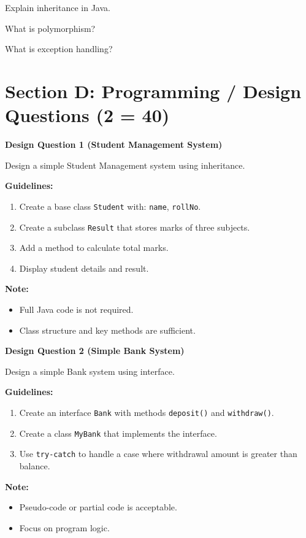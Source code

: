 \documentclass{USTBExam}
\begin{document}
\begin{problem}
Explain inheritance in Java.
\end{problem}

\begin{problem}
What is polymorphism?
\end{problem}

\begin{problem}
What is exception handling?
\end{problem}


\section{Section D: Programming / Design Questions (2  = 40)}

\begin{problem}
\textbf{Design Question 1 (Student Management System)}

Design a simple Student Management system using inheritance.

\textbf{Guidelines:}
\begin{enumerate}
  \item Create a base class \texttt{Student} with: \texttt{name}, \texttt{rollNo}.
  \item Create a subclass \texttt{Result} that stores marks of three subjects.
  \item Add a method to calculate total marks.
  \item Display student details and result.
\end{enumerate}

\textbf{Note:}
\begin{itemize}
  \item Full Java code is not required.
  \item Class structure and key methods are sufficient.
\end{itemize}
\end{problem}

\begin{problem}
\textbf{Design Question 2 (Simple Bank System)}

Design a simple Bank system using interface.

\textbf{Guidelines:}
\begin{enumerate}
  \item Create an interface \texttt{Bank} with methods \texttt{deposit()} and \texttt{withdraw()}.
  \item Create a class \texttt{MyBank} that implements the interface.
  \item Use \texttt{try-catch} to handle a case where withdrawal amount is greater than balance.
\end{enumerate}

\textbf{Note:}
\begin{itemize}
  \item Pseudo-code or partial code is acceptable.
  \item Focus on program logic.
\end{itemize}
\end{problem}
\end{document}
